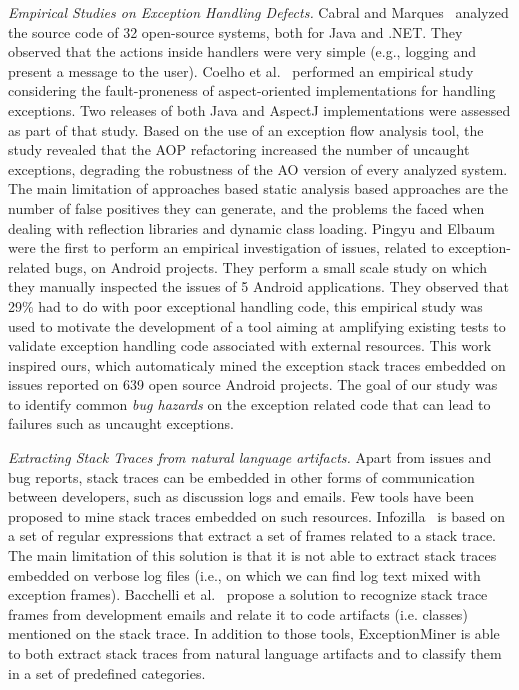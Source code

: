 \documentclass[conference]{IEEEtran}
\begin{document}
\textit{Empirical Studies on Exception Handling Defects.} 
Cabral and Marques~\cite{cabral2007exception} analyzed the
source code of 32 open-source systems, both for Java and .NET. They
observed that the actions inside handlers were very simple (e.g., logging and present a
message to the user). Coelho et al.~\cite{coelho2008assessing} performed an 
empirical study considering the fault-proneness of aspect-oriented implementations 
for handling exceptions. Two releases of both Java and AspectJ implementations were 
assessed as part of that study. Based on the use of an exception
flow analysis tool, the study revealed that the AOP  refactoring increased the 
number of uncaught exceptions, degrading the robustness of the AO version of every analyzed system.
The main limitation of approaches based static analysis based approaches are the number of false
positives they can generate, and the problems the faced when dealing with reflection libraries 
and dynamic class loading. Pingyu and Elbaum~\cite{Zhang12} were the first to perform
an empirical investigation of issues, related to exception-related bugs, on Android projects.  
They perform a small scale study on which they manually inspected the issues of 
5 Android applications. They observed that 29\% had to do with poor
exceptional handling code, this empirical study was used to motivate the development of a tool
aiming at amplifying existing tests to validate exception 
handling code associated with external resources. This work inspired ours,
 which automaticaly mined the exception stack traces embedded on issues 
reported on 639 open source Android projects. The goal of our study was
to identify common \emph{bug hazards} on the exception related code that can lead to 
failures such as uncaught exceptions. 

\textit{Extracting Stack Traces from natural language artifacts.} 
Apart from issues and bug reports, stack traces can be embedded in other forms of
communication between developers, such as discussion logs and emails.
Few tools have been proposed to mine stack traces embedded on such resources.
 Infozilla~\cite{bettenburg2008extracting} is based on a set of regular expressions that extract a set of frames
related to a stack trace. The main limitation of this solution is that it is not
able to extract stack traces embedded on verbose log files (i.e., on which we
can find log text mixed with exception frames). Bacchelli
et al.~\cite{bacchelli2012content} propose a solution to recognize stack trace frames
from development emails and relate it to code artifacts (i.e. classes) mentioned
on the stack trace. In addition to those tools, ExceptionMiner is able to 
both extract stack traces from natural language artifacts and to 
classify them in a set of predefined categories.
\end{document}

